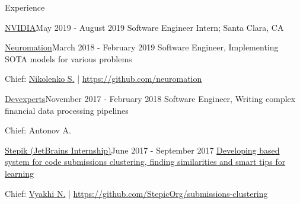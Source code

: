 \documentclass{resume} %
\newcommand{\SKIPSM}{\vspace{-0.7\baselineskip}}
\begin{document}
\SKIPSM
\begin{rSection}{Experience}

\begin{rSubsection}{\href{https://www.nvidia.com}{NVIDIA}}{May 2019 - August 2019}
{Software Engineer Intern; Santa Clara, CA}{}
\item[]
\end{rSubsection}
\vspace{-2.0\baselineskip}

\begin{rSubsection}{\href{https://neuromation.io}{Neuromation}}{March 2018 - February 2019}
{Software Engineer, Implementing SOTA models for various problems}{} 
\item[] Chief: \href{https://logic.pdmi.ras.ru/~sergey/}{Nikolenko S.} | \url{https://github.com/neuromation}
\end{rSubsection}

\vspace{-0.9\baselineskip}
\begin{rSubsection}{\href{https://devexperts.com/en/index.html}{Devexperts}}{November 2017 - February 2018}
{Software Engineer, Writing complex financial data processing pipelines}{} 
\item[] Chief: Antonov A.
\end{rSubsection}

\vspace{-0.9\baselineskip}
\begin{rSubsection}{\href{http://stepik.org/}{Stepik (JetBrains Internship)}}{June 2017 - September 2017}
{\href{https://jetbrains.ru/students/internship/themes/again/}{Developing based system for code submissions clustering, finding similarities and smart tips for learning}}{} 
\item[] Chief: \href{http://bioinformaticsinstitute.ru/teachers/vyahhi}{Vyakhi N.} | \url{https://github.com/StepicOrg/submissions-clustering}
\end{rSubsection}

\end{rSection}
\end{document}
